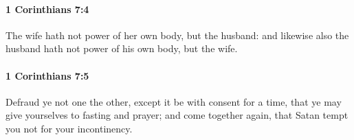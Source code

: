 		\paragraph{1 Corinthians 7:4} %
			\label{1CORINTHIANS-7-4}

			The wife hath not power of her own body, but the husband: and likewise also the husband hath not power of his own body, but the wife.

			\begin{framed}
			\scriptsize
				\begin{compactdesc}
					\item[SBLG] 
				\end{compactdesc}
			\end{framed}

		\paragraph{1 Corinthians 7:5} %
			\label{1CORINTHIANS-7-5}

			Defraud ye not one the other, except it be with consent for a time, that ye may give yourselves to fasting and prayer; and come together again, that Satan tempt you not for your incontinency.

